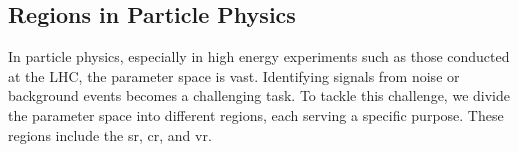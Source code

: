 







% 


\subsection{Regions in Particle Physics}

In particle physics, especially in high energy experiments such as those conducted at the LHC, the parameter space is
vast. Identifying signals from noise or background events becomes a challenging task. To tackle this challenge, we
divide the parameter space into different regions, each serving a specific purpose. These regions include the \gls{sr},
\gls{cr}, and \gls{vr}.

